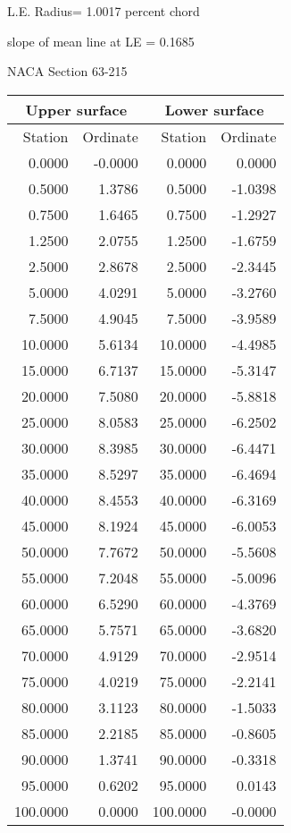 \documentclass[11pt]{book}
\begin{document}
L.E. Radius=  1.0017 percent chord


 slope of mean line at LE =  0.1685
 \newpage
  \label{s63-215}
 \begin{Large}
 NACA Section 63-215
 \end{Large}
  
 \vspace{8mm}
 \begin{tabular}{|r|r|r|r|} \hline 
 \multicolumn{2}{|c|}{Upper surface} & \multicolumn{2}{|c|}{Lower surface} \\
 \hline
 Station & Ordinate & Station & Ordinate \\
 \hline
0.0000 & -0.0000 & 0.0000 & 0.0000 \\
0.5000 & 1.3786 & 0.5000 & -1.0398 \\
0.7500 & 1.6465 & 0.7500 & -1.2927 \\
1.2500 & 2.0755 & 1.2500 & -1.6759 \\
2.5000 & 2.8678 & 2.5000 & -2.3445 \\
5.0000 & 4.0291 & 5.0000 & -3.2760 \\
7.5000 & 4.9045 & 7.5000 & -3.9589 \\
10.0000 & 5.6134 & 10.0000 & -4.4985 \\
15.0000 & 6.7137 & 15.0000 & -5.3147 \\
20.0000 & 7.5080 & 20.0000 & -5.8818 \\
25.0000 & 8.0583 & 25.0000 & -6.2502 \\
30.0000 & 8.3985 & 30.0000 & -6.4471 \\
35.0000 & 8.5297 & 35.0000 & -6.4694 \\
40.0000 & 8.4553 & 40.0000 & -6.3169 \\
45.0000 & 8.1924 & 45.0000 & -6.0053 \\
50.0000 & 7.7672 & 50.0000 & -5.5608 \\
55.0000 & 7.2048 & 55.0000 & -5.0096 \\
60.0000 & 6.5290 & 60.0000 & -4.3769 \\
65.0000 & 5.7571 & 65.0000 & -3.6820 \\
70.0000 & 4.9129 & 70.0000 & -2.9514 \\
75.0000 & 4.0219 & 75.0000 & -2.2141 \\
80.0000 & 3.1123 & 80.0000 & -1.5033 \\
85.0000 & 2.2185 & 85.0000 & -0.8605 \\
90.0000 & 1.3741 & 90.0000 & -0.3318 \\
95.0000 & 0.6202 & 95.0000 & 0.0143 \\
100.0000 & 0.0000 & 100.0000 & -0.0000 \\
 \hline 
 \end{tabular}
\end{document}
